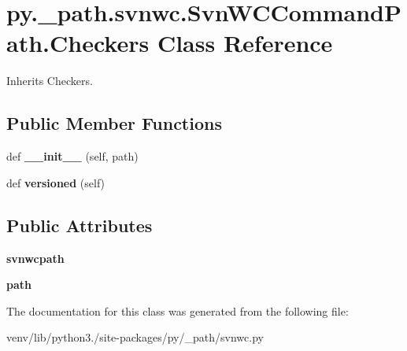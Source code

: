 \hypertarget{classpy_1_1__path_1_1svnwc_1_1_svn_w_c_command_path_1_1_checkers}{}\section{py.\+\_\+path.\+svnwc.\+Svn\+W\+C\+Command\+Path.\+Checkers Class Reference}
\label{classpy_1_1__path_1_1svnwc_1_1_svn_w_c_command_path_1_1_checkers}


Inherits Checkers.

\subsection*{Public Member Functions}
\begin{DoxyCompactItemize}
\item 
\mbox{\label{classpy_1_1__path_1_1svnwc_1_1_svn_w_c_command_path_1_1_checkers_a3acab51130f51aea725fbd30842d193b}} 
def {\bfseries \+\_\+\+\_\+init\+\_\+\+\_\+} (self, path)
\item 
\mbox{\label{classpy_1_1__path_1_1svnwc_1_1_svn_w_c_command_path_1_1_checkers_a4d99b8ddf7a7d0eef8da89cbdfd0dcc9}} 
def {\bfseries versioned} (self)
\end{DoxyCompactItemize}
\subsection*{Public Attributes}
\begin{DoxyCompactItemize}
\item 
\mbox{\label{classpy_1_1__path_1_1svnwc_1_1_svn_w_c_command_path_1_1_checkers_a771961c2a613c1fd9ba667f6c3ef1e15}} 
{\bfseries svnwcpath}
\item 
\mbox{\label{classpy_1_1__path_1_1svnwc_1_1_svn_w_c_command_path_1_1_checkers_a6c93bf632f4e997f3d70c67adcc39c46}} 
{\bfseries path}
\end{DoxyCompactItemize}


The documentation for this class was generated from the following file\+:\begin{DoxyCompactItemize}
\item 
venv/lib/python3./site-\/packages/py/\+\_\+path/svnwc.\+py\end{DoxyCompactItemize}
